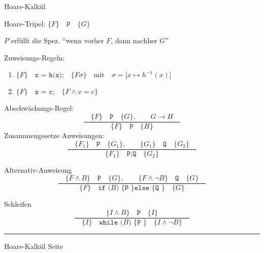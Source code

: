 \documentclass{slides}
\newcommand{\hoare}[3]{\bigl\{#1\bigr\}\quad\texttt{#2}\quad\bigl\{#3\bigr\}}
\newcounter{mypage}
\newcommand{\bruch}[2]{\frac{\displaystyle#1}{\displaystyle#2}}
\begin{document}
\begin{slide}{}
\normalsize

\begin{center}
Hoare-Kalk\"ul
\end{center}
\vspace*{0.5cm}

\footnotesize
Hoare-Tripel: \qquad $\hoare{F}{P}{G}$

$P$ erf\"ullt die Spez. ``wenn vorher $F$, dann nachher $G$''

Zuweisungs-Regeln:
\begin{enumerate}
\item $\hoare{F}{x = h(x);}{F\sigma} \quad \mathrm{mit} \quad \sigma = \bigl[x \mapsto h^{-1}(x)\bigr]$
\item $\hoare{F}{x = c;}{F \wedge x = c}$
\end{enumerate}
Abschw\"achungs-Regel:
\[ \bruch{\quad \hoare{F}{P}{G}, \qquad G \rightarrow H \quad}{\hoare{F}{P}{H}} \]
Zusammengesetze Anweisungen:
\[ \bruch{\quad\hoare{F_1}{P}{G_1}, \qquad \hoare{G_1}{Q}{G_2}\quad}{ \hoare{F_1}{P;Q}{G_2}} \]

Alternativ-Anweisung
\[  \bruch{\quad\hoare{F \wedge B}{P}{G}, \qquad \hoare{F \wedge \neg B}{Q}{G}\quad}{
              \hoare{F}{if ($B$) \{ P \} else \{ Q \}}{G}}  
\]

Schleifen
\[ 
  \bruch{\hoare{I \wedge B}{P}{I}}{\quad \hoare{I}{while ($B$) \{ P \}}{I \wedge \neg B}\quad}
\]

\vspace*{\fill}
\tiny \addtocounter{mypage}{1}
\rule{17cm}{1mm}
Hoare-Kalk\"ul \hspace*{\fill} Seite 
\end{slide}

\end{document}
